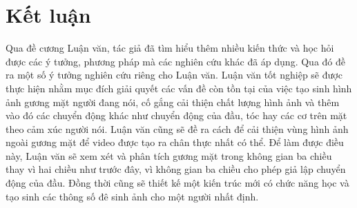 \section{\texorpdfstring{Kết luận}{Plan}}

Qua đề cương Luận văn, tác giả đã tìm hiểu thêm nhiều kiến thức và học hỏi được các ý tưởng, phương pháp mà các nghiên cứu khác đã áp dụng. Qua đó đề ra một số ý tưởng nghiên cứu riêng cho Luận văn. Luận văn tốt nghiệp sẽ được thực hiện nhằm mục đích giải quyết các vấn đề còn tồn tại của việc tạo sinh hình ảnh gương mặt người đang nói, cố gắng cải thiện chất lượng hình ảnh và thêm vào đó các chuyển động khác như chuyển động của đầu, tóc hay các cơ trên mặt theo cảm xúc người nói. Luận văn cũng sẽ đề ra cách để cải thiện vùng hình ảnh ngoài gương mặt để video được tạo ra chân thực nhất có thể. Để làm được điều này, Luận văn sẽ xem xét và phân tích gương mặt trong không gian ba chiều thay vì hai chiều như trước đây, vì không gian ba chiều cho phép giả lập chuyển động của đầu. Đồng thời cũng sẽ thiết kế một kiến trúc mới có chức năng học và tạo sinh các thông số đê sinh ảnh cho một người nhất định.

